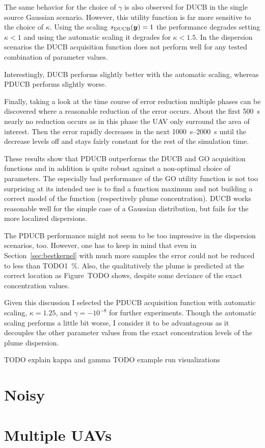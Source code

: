 The same behavior for the choice of $\gamma$ is also observed for DUCB in the 
single source Gaussian scenario. However, this utility function is far more 
sensitive to the choice of $\kappa$. Using the scaling $s_{\mathrm{DUCB}}(\bm{y}) = 1$ 
the performance degrades setting $\kappa < 1$ and using the automatic scaling it 
degrades for $\kappa < 1.5$. In the dispersion scenarios the DUCB acquisition 
function does not perform well for any tested combination of parameter values.

Interestingly,  DUCB performs slightly better with the automatic scaling, 
whereas PDUCB performs slightly worse.

Finally, taking a look at the time course of error reduction multiple phases can 
be discovered where a reasonable reduction of the error occurs. About the first 
\SI{500}{\second} nearly no reduction occurs as in this phase the UAV only 
surround the area of interest. Then the error rapidly decreases in the next 
\SIrange{1000}{2000}{\second} until the decrease levels off and stays fairly 
constant for the rest of the simulation time.

These results show that PDUCB outperforms the DUCB and GO acquisition functions 
and in addition is quite robust against a non-optimal choice of parameters. The 
especially bad performance of the GO utility function is not too surprising at 
its intended use is to find a function maximum and not building a correct model 
of the function (respectively plume concentration).  DUCB works reasonable well 
for the simple case of a Gaussian distribution, but fails for the more localized 
dispersions.

The PDUCB performance might not seem to be too impressive in the dispersion 
scenarios, too. However, one has to keep in mind that even in 
Section~\ref{sec:bestkernel} with much more samples the error could not be 
reduced to less than TODO\SI{1}{\percent}.  Also, the qualitatively the plume is 
predicted at the correct location as Figure~TODO shows, despite some deviance of 
the exact concentration values.

Given this discussion I selected the PDUCB acquisition function with automatic 
scaling, $\kappa = 1.25$, and $\gamma = -10^{-8}$ for further experiments.  
Though the automatic scaling performs a little bit worse, I consider it to be 
advantageous as it decouples the other parameter values from the exact 
concentration levels of the plume dispersion.

TODO explain kappa and gamma
TODO example run visualizations

\section{Noisy}

\section{Multiple UAVs}


